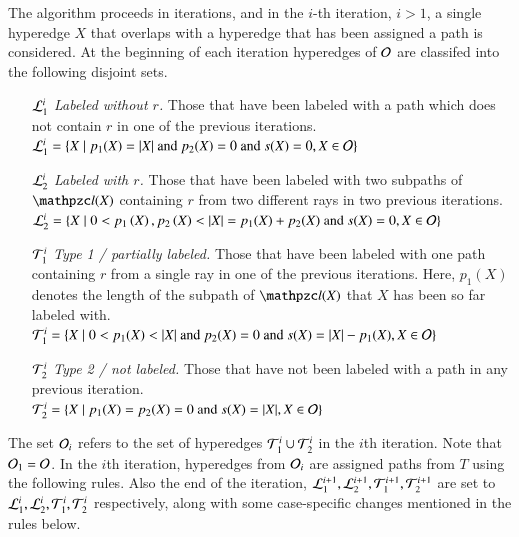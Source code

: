 \documentclass[MS,synopsis]{iitmdiss}
\begin{document}
 The algorithm proceeds in iterations, and in the $i$-th
 iteration, $i > 1$, a single hyperedge $X$ that overlaps with a
 hyperedge that has been assigned a path is considered.  At the
 beginning of each iteration hyperedges of ${\cal O}$ are classifed into
 the following disjoint sets.
 \begin{enumerate}
 \item [${\cal L}_1^i$] {\em Labeled without $r$.} Those that have been
   labeled with a path which does not contain $r$ in one of the
   previous iterations.\\  ${\cal L}_1^i = \left\{  X \mid p_1(X) = |X| \text{ and
     } p_2(X) = 0 \text{ and } s(X) = 0, X \in {\cal O}\right\}$
 \item [${\cal L}_2^i$] {\em Labeled with $r$.} Those that have been labeled
   with two subpaths of $\cl(X)$ containing $r$ from two different rays
   in two previous iterations.\\ ${\cal L}_2^i = \left\{ X \mid 0 < p_1\left(X\right),
     p_2\left(X\right) < |X|=p_1(X)+p_2(X) \text{ and } s(X) = 0, X \in {\cal O}\right\}$
   \item [${\cal T}_1^i$] {\em Type 1 / partially labeled.} Those that have
     been labeled with one path containing $r$ from a single ray in one
     of the previous iterations. Here, $p_1(X)$ denotes the length of
     the subpath of $\cl(X)$ that $X$ has been so far labeled
     with. \\
     ${\cal T}_1^i = \left\{  X \mid 0 < p_1(X) < |X| \text{ and } p_2(X) = 0
       \text{ and } s(X) = |X|-p_1(X), X \in {\cal O}\right\}$
   \item [${\cal T}_2^i$] {\em Type 2 / not labeled.} Those that have not been
     labeled with a path in any previous iteration.\\
     ${\cal T}_2^i = \left\{  X \mid p_1(X) = p_2(X) = 0 \text{ and } s(X) = |X|,
       X \in {\cal O}\right\}$
 \end{enumerate}

The set ${\cal O}_i$ refers to the set of hyperedges ${\cal T}_1^i \cup {\cal T}_2^i$
in the $i$th iteration.  Note that ${\cal O}_1 = {\cal O}$.  In the $i$th
iteration, hyperedges from ${\cal O}_i$ are assigned paths from $T$ using
the following rules. Also the end of the iteration, ${\cal L}_1^{i+1},
{\cal L}_2^{i+1}, {\cal T}_1^{i+1}, {\cal T}_2^{i+1}$ are set to ${\cal L}_1^{i},
{\cal L}_2^{i}, {\cal T}_1^{i}, {\cal T}_2^{i}$ respectively, along with some
case-specific changes mentioned in the rules below.
\end{document}
